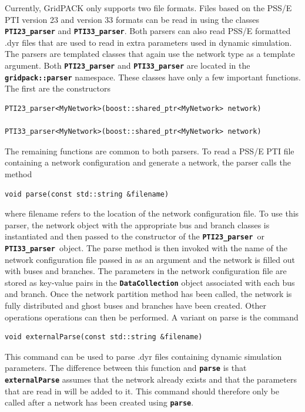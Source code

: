 \documentclass[12pt]{report} %
\begin{document}
Currently, GridPACK only supports two file formats. Files based on the PSS/E PTI version 23 and version 33 formats can be read in using the classes \texttt{\textbf{PTI23\_parser}} and \texttt{\textbf{PTI33\_parser}}. Both parsers can also read PSS/E formatted .dyr files that are used to read in extra parameters used in dynamic simulation. The parsers are templated classes that again use the network type as a template argument. Both \texttt{\textbf{PTI23\_parser}} and \texttt{\textbf{PTI33\_parser}} are located in the \texttt{\textbf{gridpack::parser}} namespace. These classes have only a few important functions. The first are the constructors

{
\color{red}
\begin{Verbatim}[fontseries=b]
PTI23_parser<MyNetwork>(boost::shared_ptr<MyNetwork> network)

PTI33_parser<MyNetwork>(boost::shared_ptr<MyNetwork> network)
\end{Verbatim}
}

The remaining functions are common to both parsers. To read a PSS/E PTI file containing a network configuration and generate a network, the parser calls the method

{
\color{red}
\begin{Verbatim}[fontseries=b]
void parse(const std::string &filename)
\end{Verbatim}
}

where filename refers to the location of the network configuration file. To use this parser, the network object with the appropriate bus and branch classes is instantiated and then passed to the constructor of the \texttt{\textbf{PTI23\_parser }}or\texttt{\textbf{ PTI33\_parser }}object. The parse method is then invoked with the name of the network configuration file passed in as an argument and the network is filled out with buses and branches. The parameters in the network configuration file are stored as key-value pairs in the \texttt{\textbf{DataCollection}} object associated with each bus and branch. Once the network partition method has been called, the network is fully distributed and ghost buses and branches have been created. Other operations operations can then be performed. A variant on parse is the command

{
\color{red}
\begin{Verbatim}[fontseries=b]
void externalParse(const std::string &filename)
\end{Verbatim}
}

This command can be used to parse .dyr files containing dynamic simulation parameters. The difference between this function and \texttt{\textbf{parse}} is that \texttt{\textbf{externalParse}} assumes that the network already exists and that the parameters that are read in will be added to it. This command should therefore only be called after a network has been created using \texttt{\textbf{parse}}.
\end{document}

